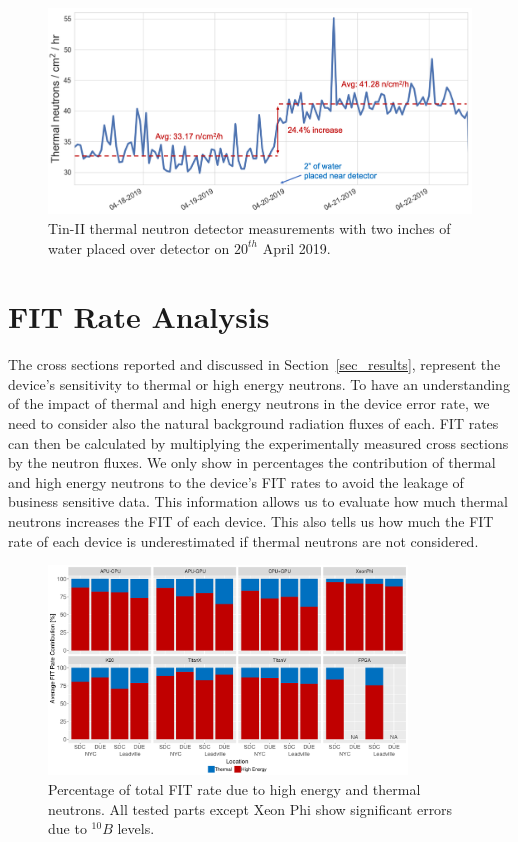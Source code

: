 \begin{figure}[tb] 
\centering
\includegraphics[width=0.82\columnwidth]{./figs/turkeypan_PR}
\caption{Tin-II thermal neutron detector measurements with two inches of water placed over detector on $20^{th}$ April 2019.}
\label{turkeypan}
\end{figure}

\section{FIT Rate Analysis}
\label{sec_fit}


The cross sections reported and discussed in Section~\ref{sec_results}, represent the device's sensitivity to thermal or high energy neutrons. To have an understanding of the impact of thermal and high energy neutrons in the device error rate, we need to consider also the natural background radiation fluxes of each. FIT rates can then be calculated by multiplying the experimentally measured cross sections by the neutron fluxes. We only show in percentages the contribution of thermal and high energy neutrons to the device's FIT rates to avoid the leakage of business sensitive data. This information allows us to evaluate how much thermal neutrons increases the FIT of each device. This also tells us how much the FIT rate of each device is underestimated if thermal neutrons are not considered.



\begin{figure}[!tb]
    \centering
    \includegraphics[width=0.85\textwidth]{figs/FIT-rates-all-devices.pdf}
    \caption{Percentage of total FIT rate due to high energy and thermal neutrons. All tested parts except Xeon Phi show significant errors due to $^{10}B$ levels.}
    \label{fig_fitpercents}
\end{figure}

